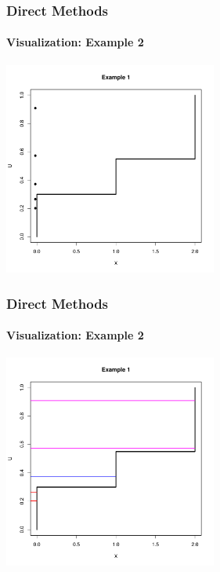 \documentclass[10pt]{beamer}
\begin{document}
              \begin{frame}
                \frametitle{Direct Methods}
                \framesubtitle{Visualization: Example 2}
                \begin{center}
                  \includegraphics[height=7cm]{./Pics/d2p1.pdf}
                \end{center}
              \end{frame}

              \begin{frame}
                \frametitle{Direct Methods}
                \framesubtitle{Visualization: Example 2}
                \begin{center}
                  \includegraphics[height=7cm]{./Pics/d2p2.pdf}
                \end{center}
              \end{frame}
\end{document}
